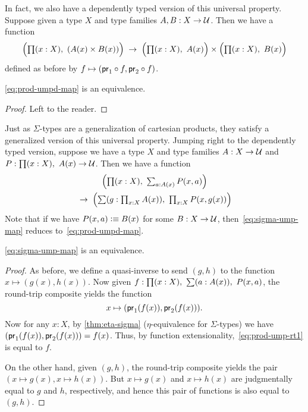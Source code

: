 In fact, we also have a dependently typed version of this universal property.
Suppose given a type $X$ and type families $A,B:X\to \mathcal{U}$.
Then we have a function
\begin{equation}\label{eq:prod-umpd-map}
  \Big(\prd{x:X} (A(x)\times B(x))\Big) \;\to\; \Big(\prd{x:X} A(x)\Big) \times \Big(\prd{x:X} B(x)\Big)
\end{equation}
defined as before by $f \mapsto (\mathsf{pr}_{1} \circ f, \mathsf{pr}_{2}\circ f)$.

\begin{thm}\label{thm:prod-umpd}
  \eqref{eq:prod-umpd-map} is an equivalence.
\end{thm}
\begin{proof}
  Left to the reader.
\end{proof}

Just as $\Sigma$-types are a generalization of cartesian products, they satisfy a generalized version of this universal property.
Jumping right to the dependently typed version, suppose we have a type $X$ and type families $A:X\to \mathcal{U}$ and $P:\prd{x:X} A(x)\to\type$.
Then we have a function
\begin{multline}
  \label{eq:sigma-ump-map}
  \Big(\prd{x:X} \textstyle\sum_{a:A(x)} P(x,a)\Big) \\ \;\to\;
  \Big(\sm{g:\textstyle\prod_{x:X} A(x)} \textstyle\prod_{x:X} P(x,g(x))\Big)
\end{multline}
Note that if we have $P(x,a) \vcentcolon\equiv B(x)$ for some $B:X\to\mathcal{U}$, then~\eqref{eq:sigma-ump-map} reduces to~\eqref{eq:prod-umpd-map}.

\begin{thm}\label{thm:ttac}
  \eqref{eq:sigma-ump-map} is an equivalence.
\end{thm}
\begin{proof}
  As before, we define a quasi-inverse to send $(g,h)$ to the function $x\mapsto (g(x),h(x))$.
  Now given $f:\prd{x:X} \sm{a:A(x)} P(x,a)$, the round-trip composite yields the function
  \begin{equation}
    x\mapsto (\mathsf{pr}_{1}(f(x)),\mathsf{pr}_{2}(f(x))).\label{eq:prod-ump-rt1}
  \end{equation}
  Now for any $x:X$, by \autoref{thm:eta-sigma} ($\eta$-equivalence for $\Sigma$-types) we have $(\mathsf{pr}_{1}(f(x)),\mathsf{pr}_{2}(f(x))) = f(x)$.
  Thus, by function extensionality,~\eqref{eq:prod-ump-rt1} is equal to $f$.

  On the other hand, given $(g,h)$, the round-trip composite yields the pair $(x\mapsto g(x),x\mapsto h(x))$.
  But $x\mapsto g(x)$ and $x\mapsto h(x)$ are judgmentally equal to $g$ and $h$, respectively, and hence this pair of functions is also equal to $(g,h)$.
\end{proof}

